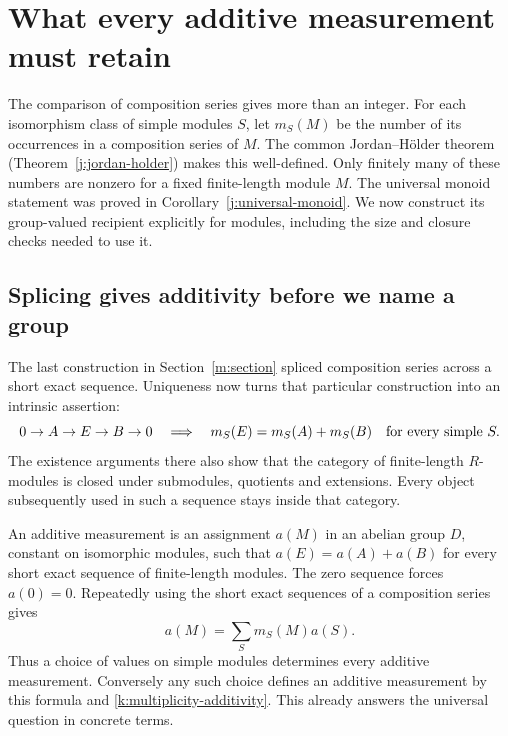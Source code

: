 \documentclass[11pt]{article}
\theoremstyle{definition}
\theoremstyle{remark}\newtheorem{remark}[theorem]{Remark}
\begin{document}
\section{What every additive measurement must retain}
\label{k:section}

The comparison of composition series gives more than an integer.
For each isomorphism class of simple modules $S$, let $m_S(M)$ be
the number of its occurrences in a composition series of $M$.
The common Jordan--H\"older theorem (Theorem~\ref{j:jordan-holder})
makes this well-defined. Only finitely many of these numbers are
nonzero for a fixed finite-length module $M$. The universal monoid
statement was proved in Corollary~\ref{j:universal-monoid}. We now
construct its group-valued recipient explicitly for modules, including
the size and closure checks needed to use it.

\subsection{Splicing gives additivity before we name a group}

The last construction in Section~\ref{m:section} spliced composition
series across a short exact sequence. Uniqueness now turns that
particular construction into an intrinsic assertion:
\begin{equation}\label{k:multiplicity-additivity}
0\to A\to E\to B\to0
\quad\Longrightarrow\quad
m_S(E)=m_S(A)+m_S(B)\quad\hbox{for every simple }S.
\end{equation}
The existence arguments there also show that the category of
finite-length $R$-modules is closed under submodules, quotients and
extensions. Every object subsequently used in such a sequence stays
inside that category.

An additive measurement is an assignment $a(M)$ in an abelian group
$D$, constant on isomorphic modules, such that
$a(E)=a(A)+a(B)$ for every short exact sequence of finite-length
modules. The zero sequence forces $a(0)=0$. Repeatedly using the
short exact sequences of a composition series gives
\begin{equation}\label{k:all-measurements}
 a(M)=\sum_S m_S(M)a(S).
\end{equation}
Thus a choice of values on simple modules determines every additive
measurement. Conversely any such choice defines an additive measurement
by this formula and \eqref{k:multiplicity-additivity}. This already
answers the universal question in concrete terms.
\end{document}
